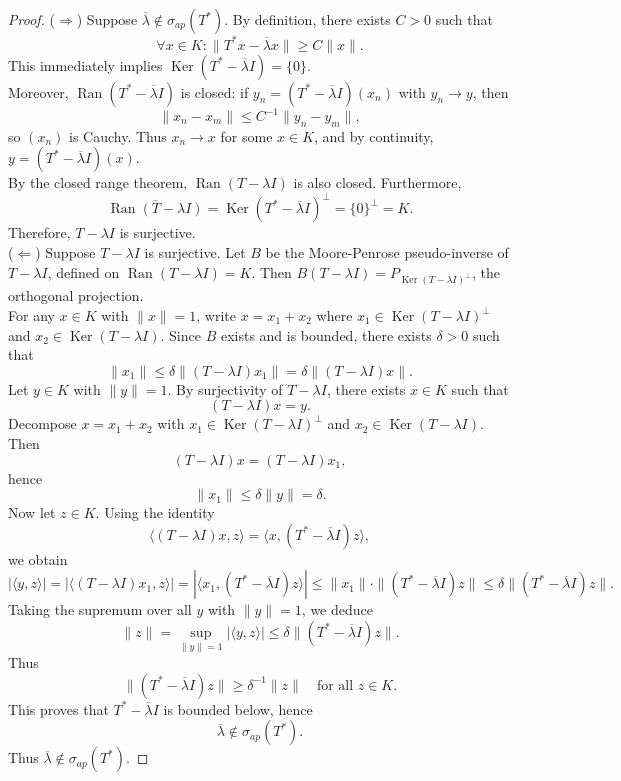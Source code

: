 \documentclass[10pt,a4paper]{amsart}
\DeclareMathOperator{\Ker}{Ker}
\DeclareMathOperator{\Ran}{Ran}
\begin{document}
\begin{proof}
($\Rightarrow$) Suppose $\overline{\lambda} \notin \sigma_{ap}(T^*)$. By definition, there exists $C > 0$ such that
\[\forall x \in K : \|T^*x - \overline{\lambda}x\| \geq C\|x\|.\]
This immediately implies $\Ker(T^* - \overline{\lambda}I) = \{0\}$. \\
Moreover, $\Ran(T^* - \overline{\lambda}I)$ is closed: if $y_n = (T^* - \overline{\lambda}I)(x_n)$ with $y_n \to y$, then
\[\|x_n - x_m\| \leq C^{-1}\|y_n - y_m\|,\]
so $(x_n)$ is Cauchy. Thus $x_n \to x$ for some $x \in K$, and by continuity, $y = (T^* - \overline{\lambda}I)(x)$. \\
By the closed range theorem, $\Ran(T - \lambda I)$ is also closed. Furthermore,
\[\overline{\Ran(T - \lambda I)} = \Ker(T^* - \overline{\lambda}I)^{\perp} = \{0\}^{\perp} = K.\]
Therefore, $T - \lambda I$ is surjective. \\
($\Leftarrow$) Suppose $T - \lambda I$ is surjective. Let $B$ be the Moore-Penrose pseudo-inverse of $T - \lambda I$, defined on $\Ran(T - \lambda I) = K$. Then $B(T - \lambda I) = P_{\Ker(T-\lambda I)^{\perp}}$, the orthogonal projection. \\
For any $x \in K$ with $\|x\| = 1$, write $x = x_1 + x_2$ where $x_1 \in \Ker(T - \lambda I)^{\perp}$ and $x_2 \in \Ker(T - \lambda I)$. Since $B$ exists and is bounded, there exists $\delta > 0$ such that
\[\|x_1\| \leq \delta\|(T - \lambda I)x_1\| = \delta\|(T - \lambda I)x\|.\]
Let $y \in K$ with $\|y\|=1$. By surjectivity of $T-\lambda I$, there exists $x \in K$ such that
\[
(T-\lambda I)x = y.
\]
Decompose $x = x_1 + x_2$ with $x_1 \in \Ker(T-\lambda I)^\perp$ and $x_2 \in \Ker(T-\lambda I)$. Then
\[
(T-\lambda I)x = (T-\lambda I)x_1,
\]
hence
\[
\|x_1\| \le \delta \|y\| = \delta.
\]
Now let $z \in K$. Using the identity
\[
\langle (T-\lambda I)x, z \rangle = \langle x, (T^*-\overline{\lambda}I)z \rangle,
\]
we obtain
\[
|\langle y, z \rangle|
= |\langle (T-\lambda I)x_1, z \rangle|
= |\langle x_1, (T^*-\overline{\lambda}I)z \rangle|
\le \|x_1\| \cdot \|(T^*-\overline{\lambda}I)z\|
\le \delta \|(T^*-\overline{\lambda}I)z\|.
\]
Taking the supremum over all $y$ with $\|y\|=1$, we deduce
\[
\|z\|
= \sup_{\|y\|=1} |\langle y,z\rangle|
\le \delta \|(T^*-\overline{\lambda}I)z\|.
\]
Thus
\[
\|(T^*-\overline{\lambda}I)z\| \ge \delta^{-1}\|z\|
\quad \text{for all } z \in K.
\]
This proves that $T^*-\overline{\lambda}I$ is bounded below, hence
\[
\overline{\lambda} \notin \sigma_{ap}(T^*).
\]
Thus $\overline{\lambda} \notin \sigma_{ap}(T^*)$. 
\end{proof}
\end{document}
